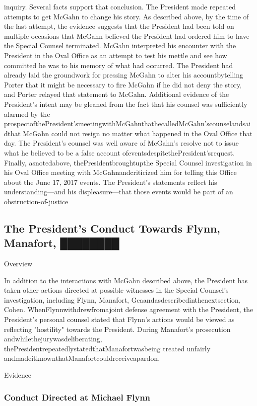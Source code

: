 inquiry.
Several facts support that conclusion.
The President made repeated attempts to get McGahn to change his story.
As described above, by the time of the last attempt, the evidence suggests that the President had been told on multiple occasions that McGahn believed the President had ordered him to have the Special Counsel terminated.
McGahn interpreted his encounter with the President in the Oval Office as an attempt to test his mettle and see how committed he was to his memory of what had occurred.
The President had already laid the groundwork for pressing McGahn to alter his accountbytelling Porter that it might be necessary to fire McGahn if he did not deny the story, and Porter relayed that statement to McGahn.
Additional evidence of the President's intent may be gleaned from the fact that his counsel was sufficiently alarmed by the prospectofthePresident'smeetingwithMcGahnthathecalledMcGahn'scounselandsaidthat McGahn could not resign no matter what happened in the Oval Office that day.
The President's counsel was well aware of McGahn's resolve not to issue what he believed to be a false account ofeventsdespitethePresident'srequest.
Finally, asnotedabove, thePresidentbroughtupthe Special Counsel investigation in his Oval Office meeting with McGahnandcriticized him for telling this Office about the June 17, 2017 events.
The President's statements reflect his understanding—and his displeasure—that those events would be part of an obstruction-of-justice

\subsection{The President's Conduct Towards Flynn, Manafort, ████████}

Overview

In addition to the interactions with McGahn described above, the President has taken other actions directed at possible witnesses in the Special Counsel's investigation, including Flynn, Manafort, Geaandasdescribedinthenextsection, Cohen.
WhenFlynnwithdrewfromajoint defense agreement with the President, the President's personal counsel stated that Flynn's actions would be viewed as reflecting "hostility" towards the President.
During Manafort's prosecution andwhilethejurywasdeliberating, thePresidentrepeatedlystatedthatManafortwasbeing treated unfairly andmadeitknownthatManafortcouldreceiveapardon.

Evidence

\subsubsection{Conduct Directed at Michael Flynn}

